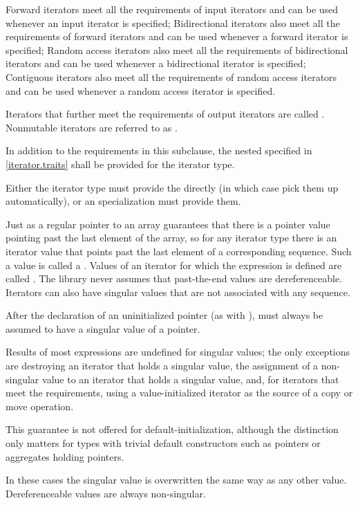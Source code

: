 \pnum
Forward iterators meet all the requirements of input
iterators and can be used whenever
an input iterator is specified;
Bidirectional iterators also meet all the requirements of
forward iterators and can be used whenever a forward iterator is specified;
Random access iterators also meet all the requirements of bidirectional
iterators and can be used whenever a bidirectional iterator is specified;
Contiguous iterators also meet all the requirements of random access
iterators and can be used whenever a random access iterator is specified.

\pnum
Iterators that further meet the requirements of output iterators are
called . Nonmutable iterators are referred to
as .

\pnum
In addition to the requirements in this subclause,
the nested  specified in \ref{iterator.traits}
shall be provided for the iterator type.
\begin{note}
Either the iterator type must provide the  directly
(in which case  pick them up automatically), or
an  specialization must provide them.
\end{note}

\pnum
Just as a regular pointer to an array guarantees that there is a pointer value pointing past the last element
of the array, so for any iterator type there is an iterator value that points past the last element of a
corresponding sequence.
Such a value is called a .
Values of an iterator
for which the expression
is defined are called
.
The library never assumes that past-the-end values are dereferenceable.
Iterators can also have singular values that are not associated with any
sequence.
\begin{example}
After the declaration of an uninitialized pointer
(as with
),
must always be assumed to have a singular value of a pointer.
\end{example}
Results of most expressions are undefined for singular values;
the only exceptions are destroying an iterator that holds a singular value,
the assignment of a non-singular value to
an iterator that holds a singular value, and, for iterators that meet the
 requirements, using a value-initialized iterator
as the source of a copy or move operation.
\begin{note}
This guarantee is not
offered for default-initialization, although the distinction only matters for types
with trivial default constructors such as pointers or aggregates holding pointers.
\end{note}
In these cases the singular
value is overwritten the same way as any other value.
Dereferenceable
values are always non-singular.

